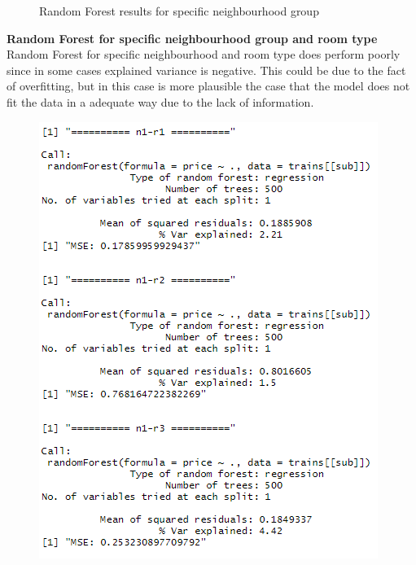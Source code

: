 \documentclass{FR16}
\begin{document}
\begin{figure}[!htb]
\begin{minipage}{0.48\textwidth}
   \end{minipage}
        \caption{ Random Forest results for specific neighbourhood group}\label{fig:14}

\end{figure}

\newpage
\noindent \textbf{Random Forest  for specific neighbourhood group and room type}\\
Random Forest for specific neighbourhood and room type does perform poorly since in some cases explained variance is negative. This could be due to the fact of overfitting, but in this case is more plausible the case that the model does not fit the data in a adequate way due to the lack of information. 
\begin{figure}[!htb]
   \begin{minipage}{0.33\textwidth}
     \centering
     \includegraphics[width=1\linewidth]{figures/rf2.png} 
   \end{minipage}\hfill
   \begin{minipage}{0.33\textwidth}

\end{minipage}
\end{figure}
\end{document}

